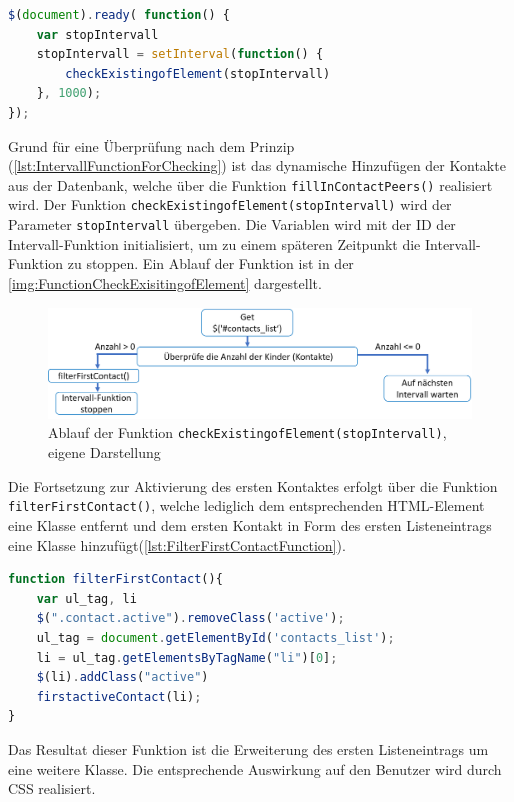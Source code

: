\documentclass[a4paper,titlepage,halfparskip,12pt]{scrreprt}
\begin{document}
\begin{onehalfspacing}
\begin{lstlisting}[language=Javascript,caption= Ready() Funktion mit der Intervall-Funktion zur Überprüfung der Kontaktliste,label={lst:IntervallFunctionForChecking}]
$(document).ready( function() {
	var stopIntervall 
	stopIntervall = setInterval(function() {
		checkExistingofElement(stopIntervall)
	}, 1000);
});
\end{lstlisting}
Grund für eine Überprüfung nach dem Prinzip (\autoref{lst:IntervallFunctionForChecking}) ist das dynamische Hinzufügen der Kontakte aus der Datenbank, welche über die Funktion \texttt{fillInContactPeers()} realisiert wird. Der Funktion \texttt{checkExistingofElement(stopIntervall)} wird der Parameter \texttt{stopIntervall} übergeben. Die Variablen wird mit der ID der Intervall-Funktion initialisiert, um zu einem späteren Zeitpunkt die Intervall-Funktion zu stoppen. Ein Ablauf der Funktion ist in der \autoref{img:FunctionCheckExisitingofElement} dargestellt.
\begin{figure}[h]
	\centering
	\includegraphics[scale=0.7]{images/FunctionCheckExisitingofElement}
	\caption{Ablauf der Funktion \texttt{checkExistingofElement(stopIntervall)}, eigene Darstellung}
	\label{img:FunctionCheckExisitingofElement}
\end{figure}
Die Fortsetzung zur Aktivierung des ersten Kontaktes erfolgt über die Funktion \texttt{filterFirstContact()}, welche lediglich dem entsprechenden \ac{HTML}-Element eine Klasse entfernt und dem ersten Kontakt in Form des ersten Listeneintrags eine Klasse hinzufügt(\autoref{lst:FilterFirstContactFunction}).
\begin{lstlisting}[language=Javascript,caption= \texttt{filterFirstContact}-Funktion,label={lst:FilterFirstContactFunction}]
function filterFirstContact(){
	var ul_tag, li
	$(".contact.active").removeClass('active');
	ul_tag = document.getElementById('contacts_list');
	li = ul_tag.getElementsByTagName("li")[0];
	$(li).addClass("active")
	firstactiveContact(li);  
}
\end{lstlisting}
Das Resultat dieser Funktion ist die Erweiterung des ersten Listeneintrags um eine weitere Klasse. Die entsprechende Auswirkung auf den Benutzer wird durch CSS realisiert.

\end{onehalfspacing}
\end{document}
